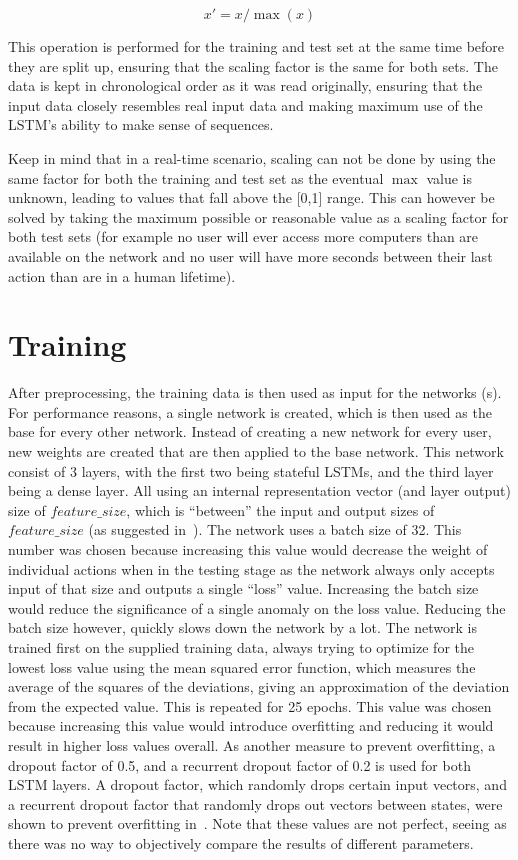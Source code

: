 $$ x' = x / \max (x) $$

This operation is performed for the training and test set at the same time before they are split up, ensuring that the scaling factor is the same for both sets. The data is kept in chronological order as it was read originally, ensuring that the input data closely resembles real input data and making maximum use of the LSTM's ability to make sense of sequences.

Keep in mind that in a real-time scenario, scaling can not be done by using the same factor for both the training and test set as the eventual \(\max \) value is unknown, leading to values that fall above the [0,1] range. This can however be solved by taking the maximum possible or reasonable value as a scaling factor for both test sets (for example no user will ever access more computers than are available on the network and no user will have more seconds between their last action than are in a human lifetime).

\section{Training}
After preprocessing, the training data is then used as input for the networks (s). For performance reasons, a single network is created, which is then used as the base for every other network. Instead of creating a new network for every user, new weights are created that are then applied to the base network. This network consist of 3 layers, with the first two being stateful LSTMs, and the third layer being a dense layer. All using an internal representation vector (and layer output) size of \(feature\_size \), which is \enquote{between} the input and output sizes of \(feature\_size \) (as suggested in~\cite{heaton2008introduction}). The network uses a batch size of 32. This number was chosen because increasing this value would decrease the weight of individual actions when in the testing stage as the network always only accepts input of that size and outputs a single \enquote{loss} value. Increasing the batch size would reduce the significance of a single anomaly on the loss value. Reducing the batch size however, quickly slows down the network by a lot. The network is trained first on the supplied training data, always trying to optimize for the lowest loss value using the mean squared error function, which measures the average of the squares of the deviations, giving an approximation of the deviation from the expected value. This is repeated for 25 epochs. This value was chosen because increasing this value would introduce overfitting and reducing it would result in higher loss values overall. As another measure to prevent overfitting, a dropout factor of 0.5, and a recurrent dropout factor of 0.2 is used for both LSTM layers. A dropout factor, which randomly drops certain input vectors, and a recurrent dropout factor that randomly drops out vectors between states, were shown to prevent overfitting in~\cite{srivastava2014dropout}. Note that these values are not perfect, seeing as there was no way to objectively compare the results of different parameters.

